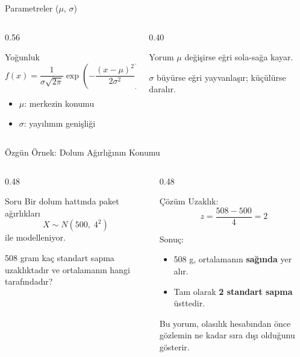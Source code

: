 \documentclass[light]{lutbeamer}
\begin{document}
\begin{frame}{Parametreler ($\mu$, $\sigma$)}
\small
\begin{columns}[T,onlytextwidth]
    \begin{column}{0.56\textwidth}
        \begin{block}{Yoğunluk}
            \[
            f(x)=\frac{1}{\sigma\sqrt{2\pi}}
            \exp\!\left(-\frac{(x-\mu)^2}{2\sigma^2}\right)
            \]
        \end{block}

        \begin{itemize}
            \item $\mu$: merkezin konumu
            \item $\sigma$: yayılımın genişliği
        \end{itemize}
    \end{column}
    \begin{column}{0.40\textwidth}
        \begin{exampleblock}{Yorum}
            $\mu$ değişirse eğri sola-sağa kayar.

            \vspace{0.15cm}
            $\sigma$ büyürse eğri yayvanlaşır; küçülürse daralır.
        \end{exampleblock}
    \end{column}
\end{columns}
\end{frame}

\begin{frame}{Özgün Örnek: Dolum Ağırlığının Konumu}
\small
\begin{columns}[T,onlytextwidth]
    \begin{column}{0.48\textwidth}
        \begin{block}{Soru}
            Bir dolum hattında paket ağırlıkları
            \[
            X \sim N(500,\;4^2)
            \]
            ile modelleniyor.

            \vspace{0.15cm}
            508 gram kaç standart sapma uzaklıktadır ve ortalamanın hangi tarafındadır?
        \end{block}
    \end{column}
    \begin{column}{0.48\textwidth}
        \begin{exampleblock}{Çözüm}
            Uzaklık:
            \[
            z=\frac{508-500}{4}=2
            \]

            Sonuç:
            \begin{itemize}
                \item 508 g, ortalamanın \textbf{sağında} yer alır.
                \item Tam olarak \textbf{2 standart sapma} üsttedir.
            \end{itemize}

            Bu yorum, olasılık hesabından önce gözlemin ne kadar sıra dışı olduğunu gösterir.
        \end{exampleblock}
    \end{column}
\end{columns}
\end{frame}
\end{document}
